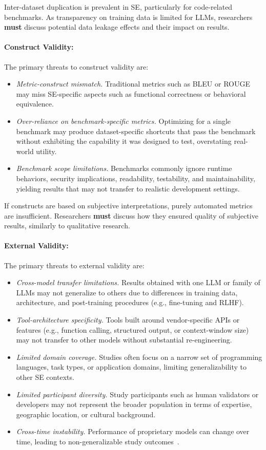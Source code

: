\documentclass[smallextended]{svjour3}
\newcommand{\must}{\textbf{must}\xspace}
\begin{document}
Inter-dataset duplication is prevalent in SE, particularly for code-related benchmarks. As transparency on training data is limited for LLMs, researchers \must discuss potential data leakage effects and their impact on results.

\paragraph{Construct Validity:}
The primary threats to construct validity are:
\begin{itemize}
	\item \emph{Metric-construct mismatch.} Traditional metrics such as BLEU or ROUGE may miss SE-specific aspects such as functional correctness or behavioral equivalence.
	\item \emph{Over-reliance on benchmark-specific metrics.} Optimizing for a single benchmark may produce dataset-specific shortcuts that pass the benchmark without exhibiting the capability it was designed to test, overstating real-world utility.
	\item \emph{Benchmark scope limitations.} Benchmarks commonly ignore runtime behaviors, security implications, readability, testability, and maintainability, yielding results that may not transfer to realistic development settings.
\end{itemize}

If constructs are based on subjective interpretations, purely automated metrics are insufficient. Researchers \must discuss how they ensured quality of subjective results, similarly to qualitative research.

\paragraph{External Validity:}
The primary threats to external validity are:
\begin{itemize}
    \item \emph{Cross-model transfer limitations.} Results obtained with one LLM or family of LLMs may not generalize to others due to differences in training data, architecture, and post-training procedures (e.g., fine-tuning and RLHF).
    \item \emph{Tool-architecture specificity.} Tools built around vendor-specific APIs or features (e.g., function calling, structured output, or context-window size) may not transfer to other models without substantial re-engineering.
    \item \emph{Limited domain coverage.} Studies often focus on a narrow set of programming languages, task types, or application domains, limiting generalizability to other SE contexts.
    \item \emph{Limited participant diversity.} Study participants such as human validators or developers may not represent the broader population in terms of expertise, geographic location, or cultural background.
    \item \emph{Cross-time instability.} Performance of proprietary models can change over time, leading to non-generalizable study outcomes~\cite{DBLP:journals/corr/abs-2307-09009, doi:10.1148/radiol.232411}.
\end{itemize}
\end{document}

